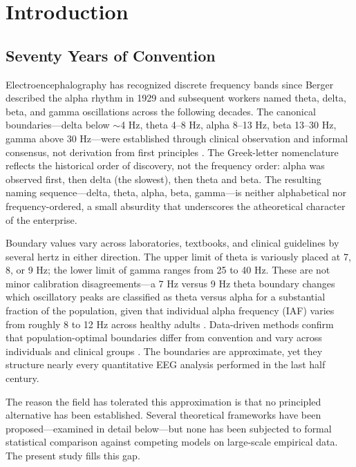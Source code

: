 \section{Introduction}

\subsection{Seventy Years of Convention}

Electroencephalography has recognized discrete frequency bands since Berger described the alpha rhythm in 1929 and subsequent workers named theta, delta, beta, and gamma oscillations across the following decades. The canonical boundaries---delta below $\sim$4 Hz, theta 4--8 Hz, alpha 8--13 Hz, beta 13--30 Hz, gamma above 30 Hz---were established through clinical observation and informal consensus, not derivation from first principles \parencite{buzsaki2006rhythms}. The Greek-letter nomenclature reflects the historical order of discovery, not the frequency order: alpha was observed first, then delta (the slowest), then theta and beta. The resulting naming sequence---delta, theta, alpha, beta, gamma---is neither alphabetical nor frequency-ordered, a small absurdity that underscores the atheoretical character of the enterprise.

Boundary values vary across laboratories, textbooks, and clinical guidelines by several hertz in either direction. The upper limit of theta is variously placed at 7, 8, or 9 Hz; the lower limit of gamma ranges from 25 to 40 Hz. These are not minor calibration disagreements---a 7 Hz versus 9 Hz theta boundary changes which oscillatory peaks are classified as theta versus alpha for a substantial fraction of the population, given that individual alpha frequency (IAF) varies from roughly 8 to 12 Hz across healthy adults \parencite{klimesch1999eeg,corcoran2018iaf,grandy2013iaf}. Data-driven methods confirm that population-optimal boundaries differ from convention and vary across individuals and clinical groups \parencite{cohen2021gedbounds,talebi2022datadriven}. The boundaries are approximate, yet they structure nearly every quantitative EEG analysis performed in the last half century.

The reason the field has tolerated this approximation is that no principled alternative has been established. Several theoretical frameworks have been proposed---examined in detail below---but none has been subjected to formal statistical comparison against competing models on large-scale empirical data. The present study fills this gap.

